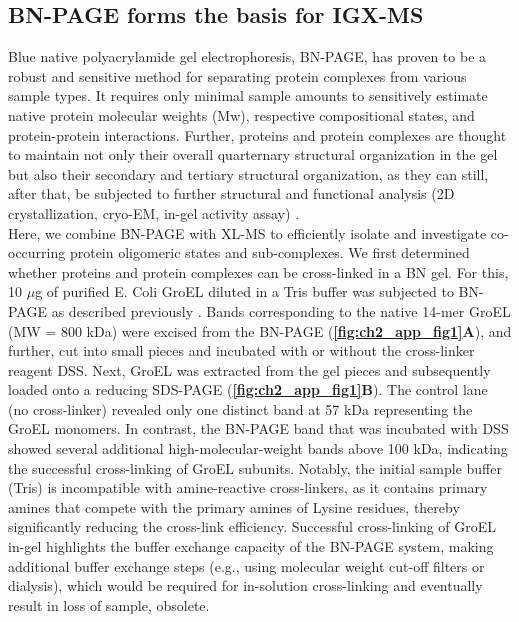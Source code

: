 \subsection*{BN-PAGE forms the basis for IGX-MS}
Blue native polyacrylamide gel electrophoresis, BN-PAGE, has proven to be a robust and sensitive method for separating protein complexes from various sample types. It requires only minimal sample amounts to sensitively estimate native protein molecular weights (Mw), respective compositional states, and protein-protein interactions. Further, proteins and protein complexes are thought to maintain not only their overall quarternary structural organization in the gel but also their secondary and tertiary structural organization, as they can still, after that, be subjected to further structural and functional analysis (2D crystallization, cryo-EM, in-gel activity assay) \cite{Poetsch_2000, Schafer_2006, Wittig_2007}.\\
Here, we combine BN-PAGE with XL-MS to efficiently isolate and investigate co-occurring protein oligomeric states and sub-complexes. We first determined whether proteins and protein complexes can be cross-linked in a BN gel. For this, 10 $\mu$g of purified E. Coli GroEL diluted in a Tris buffer was subjected to BN-PAGE as described previously \cite{Wittig_2006}. Bands corresponding to the native 14-mer GroEL (MW = 800 kDa) were excised from the BN-PAGE (\textbf{\autoref{fig:ch2_app_fig1}A}), and further, cut into small pieces and incubated with or without the cross-linker reagent DSS. Next, GroEL was extracted from the gel pieces and subsequently loaded onto a reducing SDS-PAGE (\textbf{\autoref{fig:ch2_app_fig1}B}). The control lane (no cross-linker) revealed only one distinct band at 57 kDa representing the GroEL monomers. In contrast, the BN-PAGE band that was incubated with DSS showed several additional high-molecular-weight bands above 100 kDa, indicating the successful cross-linking of GroEL subunits. Notably, the initial sample buffer (Tris) is incompatible with amine-reactive cross-linkers, as it contains primary amines that compete with the primary amines of Lysine residues, thereby significantly reducing the cross-link efficiency. Successful cross-linking of GroEL in-gel highlights the buffer exchange capacity of the BN-PAGE system, making additional buffer exchange steps (e.g., using molecular weight cut-off filters or dialysis), which would be required for in-solution cross-linking and eventually result in loss of sample, obsolete.
%
